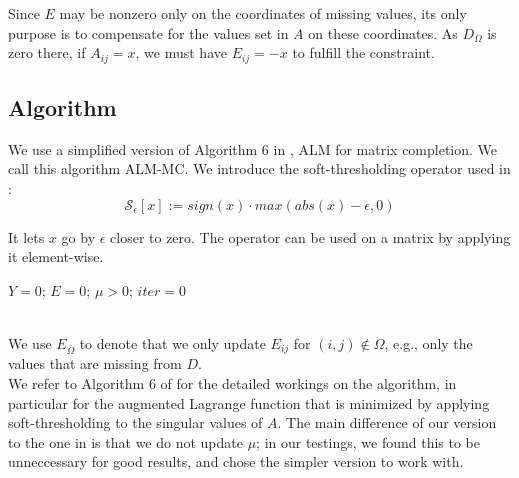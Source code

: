 \documentclass[10pt,conference,compsocconf]{IEEEtran}
\begin{document}
Since $E$ may be nonzero only on the coordinates of missing values, its only purpose is to compensate for the values set in $A$ on these coordinates. As $D_{\Omega}$ is zero there, if $A_{ij} = x$, we must have $E_{ij} = -x$ to fulfill the constraint. \\

\subsection{Algorithm}

We use a simplified version of Algorithm 6 in \cite{almpaper}, ALM for matrix completion. We call this algorithm ALM-MC. We introduce the soft-thresholding operator used in \cite{almpaper}: \\

$$\mathcal{S}_{\epsilon}[x] := sign(x) \cdot max(abs(x) - \epsilon, 0)$$

It lets $x$ go by $\epsilon$ closer to zero. The operator can be used on a matrix by applying it element-wise. 


\begin{algorithm}
$Y = 0$; $E = 0$; $\mu > 0$; $iter = 0$ \\
\ \\

\end{algorithm}

We use $E_{\bar{\Omega}}$ to denote that we only update $E_{ij}$ for $(i, j) \notin \Omega$, e.g., only the values that are missing from $D$. \\

We refer to Algorithm 6 of \cite{almpaper} for the detailed workings on the algorithm, in particular for the augmented Lagrange function that is minimized by applying soft-thresholding to the singular values of $A$. The main difference of our version to the one in \cite{almpaper} is
that we do not update $\mu$; in our testings, we found this to be unneccessary for good results, and chose the simpler version to work with.
\end{document}
